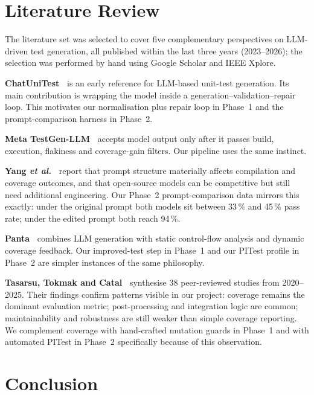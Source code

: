 \documentclass[journal]{IEEEtran}
\begin{document}
\section{Literature Review}\label{sec:lit}

The literature set was selected to cover five complementary perspectives
on LLM-driven test generation, all published within the last three years
(2023--2026); the selection was performed by hand using Google Scholar
and IEEE Xplore.

\textbf{ChatUniTest~\cite{chatunitest}} is an early reference for LLM-based
unit-test generation. Its main contribution is wrapping the model inside
a generation--validation--repair loop. This motivates our normalisation
plus repair loop in Phase~1 and the prompt-comparison harness in
Phase~2.

\textbf{Meta TestGen-LLM~\cite{metatestgen}} accepts model output only
after it passes build, execution, flakiness and coverage-gain filters.
Our pipeline uses the same instinct.

\textbf{Yang \emph{et al.}~\cite{yang2024}} report that prompt structure
materially affects compilation and coverage outcomes, and that
open-source models can be competitive but still need additional
engineering. Our Phase~2 prompt-comparison data mirrors this exactly:
under the original prompt both models sit between 33\,\% and 45\,\%
pass rate; under the edited prompt both reach 94\,\%.

\textbf{Panta~\cite{panta2024}} combines LLM generation with static
control-flow analysis and dynamic coverage feedback. Our improved-test
step in Phase~1 and our PITest profile in Phase~2 are simpler instances
of the same philosophy.

\textbf{Tasarsu, Tokmak and Catal~\cite{lit_review}} synthesise 38
peer-reviewed studies from 2020--2025. Their findings confirm patterns
visible in our project: coverage remains the dominant evaluation metric;
post-processing and integration logic are common; maintainability and
robustness are still weaker than simple coverage reporting. We
complement coverage with hand-crafted mutation guards in Phase~1 and
with automated PITest in Phase~2 specifically because of this
observation.

\section{Conclusion}\label{sec:conclusion}
\end{document}
